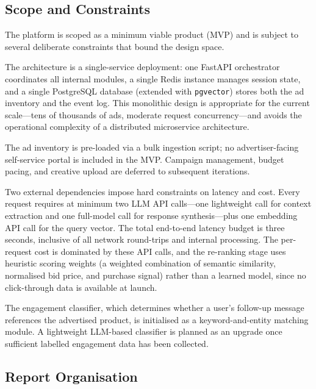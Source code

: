 \subsection{Scope and Constraints}
\label{subsec:scope}

The platform is scoped as a minimum viable product (MVP) and is subject to
several deliberate constraints that bound the design space.

The architecture is a single-service deployment: one FastAPI orchestrator
coordinates all internal modules, a single Redis instance manages session state,
and a single PostgreSQL database (extended with \texttt{pgvector}) stores both
the ad inventory and the event log. This monolithic design is appropriate for the
current scale---tens of thousands of ads, moderate request concurrency---and
avoids the operational complexity of a distributed microservice architecture.

The ad inventory is pre-loaded via a bulk ingestion script; no advertiser-facing
self-service portal is included in the MVP. Campaign management, budget pacing,
and creative upload are deferred to subsequent iterations.

Two external dependencies impose hard constraints on latency and cost. Every
request requires at minimum two LLM API calls---one lightweight call for context
extraction and one full-model call for response synthesis---plus one embedding
API call for the query vector. The total end-to-end latency budget is three
seconds, inclusive of all network round-trips and internal processing. The
per-request cost is dominated by these API calls, and the re-ranking stage uses
heuristic scoring weights (a weighted combination of semantic similarity, normalised
bid price, and purchase signal) rather than a learned model, since no
click-through data is available at launch.

The engagement classifier, which determines whether a user's follow-up message
references the advertised product, is initialised as a keyword-and-entity
matching module. A lightweight LLM-based classifier is planned as an upgrade
once sufficient labelled engagement data has been collected.

\subsection{Report Organisation}
\label{subsec:report-org}

